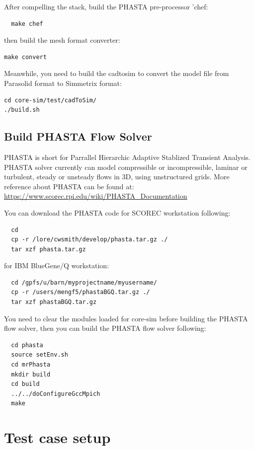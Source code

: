 \documentclass{article}
\begin{document}
After compelling the stack, build the PHASTA pre-processor 'chef:
\begin{lstlisting}
  make chef
\end{lstlisting}

then build the mesh format converter:
\begin{lstlisting}
make convert 
\end{lstlisting}

Meanwhile, you need to build the cadtosim to convert the model file from Parasolid format to Simmetrix format:
\begin{lstlisting}
cd core-sim/test/cadToSim/ 
./build.sh 
\end{lstlisting}

\subsection{Build PHASTA Flow Solver}

PHASTA is short for Parrallel Hierarchic Adaptive Stablized Transient Analysis.  PHASTA solver currently can model compressible or incompressible, laminar or turbulent, steady or unsteady flows in 3D, using unstructured grids. More reference about PHASTA can be found at:\\
\url{https://www.scorec.rpi.edu/wiki/PHASTA_Documentation} 

You can download the PHASTA code for SCOREC workstation following:
\begin{lstlisting}
  cd 
  cp -r /lore/cwsmith/develop/phasta.tar.gz ./
  tar xzf phasta.tar.gz
   \end{lstlisting}
for IBM BlueGene/Q workstation:
\begin{lstlisting}
  cd /gpfs/u/barn/myprojectname/myusername/
  cp -r /users/mengf5/phastaBGQ.tar.gz ./
  tar xzf phastaBGQ.tar.gz
   \end{lstlisting}
 
You need to clear the modules loaded for core-sim before building the PHASTA flow solver, then you can build the PHASTA flow solver following:
\begin{lstlisting}
  cd phasta
  source setEnv.sh
  cd mrPhasta
  mkdir build
  cd build
  ../../doConfigureGccMpich
  make
\end{lstlisting}


\section{Test case setup}
\end{document}
